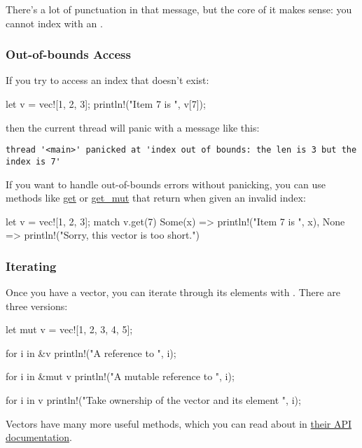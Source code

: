 There's a lot of punctuation in that message, but the core of it makes sense: you cannot index with an \itt.

\subsubsection*{Out-of-bounds Access}

If you try to access an index that doesn't exist:

\begin{rustc}
let v = vec![1, 2, 3];
println!("Item 7 is {}", v[7]);
\end{rustc}

then the current thread will panic with a message like this:

\begin{verbatim}
thread '<main>' panicked at 'index out of bounds: the len is 3 but the index is 7'
\end{verbatim}

If you want to handle out-of-bounds errors without panicking, you can use methods like 
\href{http://doc.rust-lang.org/std/vec/struct.Vec.html#method.get}{get} or 
\href{http://doc.rust-lang.org/std/vec/struct.Vec.html#method.get_mut}{get\_mut} that return  when given an invalid index:

\begin{rustc}
let v = vec![1, 2, 3];
match v.get(7) {
    Some(x) => println!("Item 7 is {}", x),
    None => println!("Sorry, this vector is too short.")
}
\end{rustc}

\subsubsection*{Iterating}

Once you have a vector, you can iterate through its elements with . There are three versions:

\begin{rustc}
let mut v = vec![1, 2, 3, 4, 5];

for i in &v {
    println!("A reference to {}", i);
}

for i in &mut v {
    println!("A mutable reference to {}", i);
}

for i in v {
    println!("Take ownership of the vector and its element {}", i);
}
\end{rustc}

Vectors have many more useful methods, which you can read about in \href{https://doc.rust-lang.org/std/vec/}{their API documentation}.

